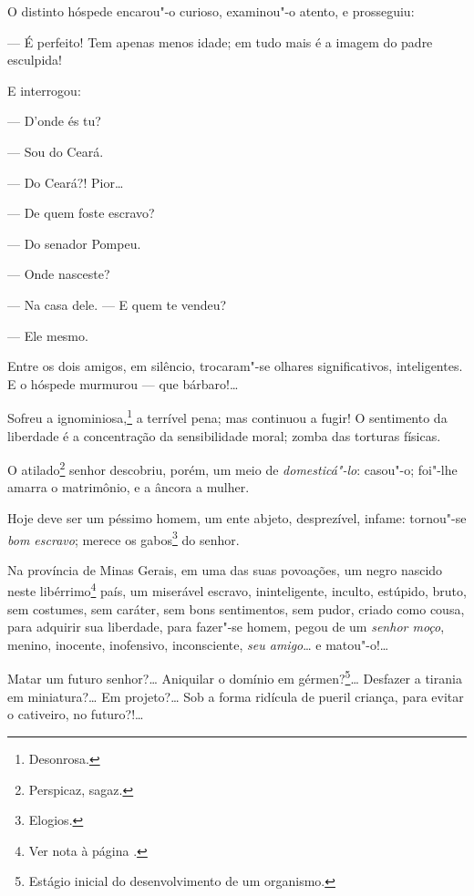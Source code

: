   O distinto hóspede encarou"-o curioso, examinou"-o atento, e prosseguiu:

--- É perfeito! Tem apenas menos idade; em tudo mais é a imagem do
padre esculpida!

E interrogou:

  --- D'onde és tu?

  --- Sou do Ceará.

  --- Do Ceará?! Pior\ldots{}

  --- De quem foste escravo?

  --- Do senador Pompeu.

  --- Onde nasceste?

  --- Na casa dele.
  --- E quem te vendeu?

  --- Ele mesmo.

  Entre os dois amigos, em silêncio, trocaram"-se olhares significativos,
  inteligentes. E o hóspede murmurou --- que bárbaro!\ldots{}


  Sofreu a ignominiosa,\footnote{Desonrosa.} a terrível pena; mas
  continuou a fugir! O sentimento da liberdade é a concentração da
  sensibilidade moral; zomba das torturas físicas.

  O atilado\footnote{Perspicaz, sagaz.} senhor descobriu, porém, um
    meio de \emph{domesticá"-lo}: casou"-o; foi"-lhe amarra o matrimônio, e a
    âncora a mulher.

  Hoje deve ser um péssimo homem, um ente abjeto, desprezível, infame:
  tornou"-se \emph{bom escravo}; merece os gabos\footnote{Elogios.} do
  senhor.

\asterisc

  Na província de Minas Gerais, em uma das suas povoações, um negro
  nascido neste libérrimo\footnote{Ver nota à página \pageref{liberrimo}.} país, um miserável escravo,
  ininteligente, inculto, estúpido, bruto, sem costumes, sem caráter,
  sem bons sentimentos, sem pudor, criado como cousa, para adquirir sua
  liberdade, para fazer"-se homem, pegou de um \emph{senhor moço},
  menino, inocente, inofensivo, inconsciente, \emph{seu amigo}\ldots{} e
  matou"-o!\ldots{}

  Matar um futuro senhor?\ldots{} Aniquilar o domínio em gérmen?\footnote{
    Estágio inicial do desenvolvimento de um organismo.}\ldots{} Desfazer a
  tirania em miniatura?\ldots{} Em projeto?\ldots{} Sob a forma ridícula de pueril
  criança, para evitar o cativeiro, no futuro?!\ldots{}

